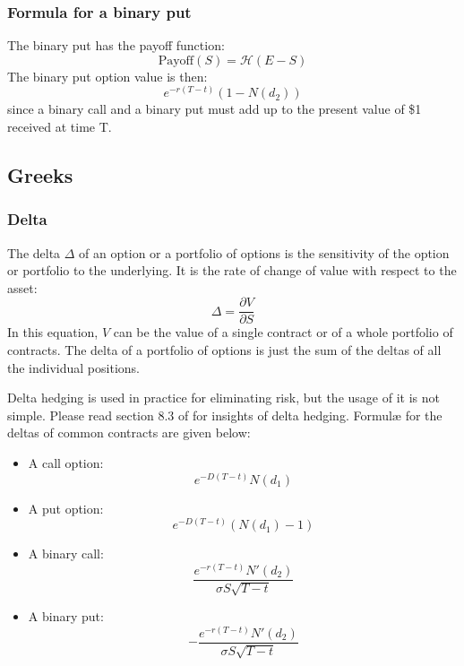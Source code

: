 \subsubsection{Formula for a binary put}
The binary put has the payoff function:
\begin{equation}
    \text{Payoff}(S) = \mathcal{H}(E-S)
\end{equation}
The binary put option value is then:
\begin{equation}
    e^{-r(T-t)} \left( 1 - N(d_2) \right)
\end{equation}
since a binary call and a binary put must add up to the present value of \$1 received at time T.


\subsection{Greeks}

\subsubsection{Delta}
The delta $\Delta$ of an option or a portfolio of options is the sensitivity of the option or portfolio to the underlying. It is the rate of change of value with respect to the asset:
\begin{equation}
    \Delta = \frac{\partial V}{\partial S}
\end{equation}
In this equation, $V$ can be the value of a single contract or of a whole portfolio of contracts. The delta of a portfolio of options is just the sum of the deltas of all the individual positions.

Delta hedging is used in practice for eliminating risk, but the usage of it is not simple. Please read section 8.3 of \cite{pw_iqf2ed_2007} for insights of delta hedging. Formul{\ae} for the deltas of common contracts are given below:
\begin{itemize}
	\setlength\itemsep{0em}
	\item A call option:
	\begin{equation}
		e^{-D(T-t)} N(d_1)
	\end{equation}
	\item A put option:
	\begin{equation}
		e^{-D(T-t)} \left( N(d_1) - 1 \right)
	\end{equation}
	\item A binary call:
	\begin{equation}
		\frac{e^{-r(T-t)} N'(d_2)}{\sigma S \sqrt{T-t}}
	\end{equation}
	\item A binary put:
	\begin{equation}
		-\frac{e^{-r(T-t)} N'(d_2)}{\sigma S \sqrt{T-t}}
	\end{equation}
\end{itemize}


